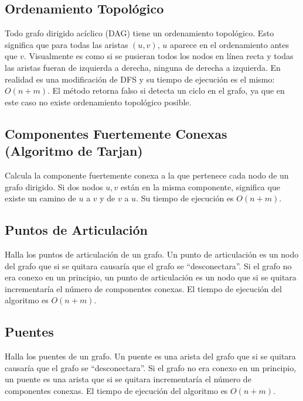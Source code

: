 \documentclass{article}
\begin{document}
\begin{multicols}{2}
	\subsection{Ordenamiento Topológico}
	Todo grafo dirigido acíclico (DAG) tiene un ordenamiento topológico. Esto significa que para todas las aristas \((u,v)\), \(u\) aparece en el ordenamiento antes que \(v\). Visualmente es como si se pusieran todos los nodos en línea recta y todas las aristas fueran de izquierda a derecha, ninguna de derecha a izquierda. En realidad es una modificación de DFS y su tiempo de ejecución es el mismo: \( O(n + m) \). El método retorna falso si detecta un ciclo en el grafo, ya que en este caso no existe ordenamiento topológico posible.
	
	
	\subsection{Componentes Fuertemente Conexas (Algoritmo de Tarjan)}
	Calcula la componente fuertemente conexa a la que pertenece cada nodo de un grafo dirigido. Si dos nodos \( u,v \) están en la misma componente, significa que existe un camino de \( u \) a \( v \) y de \( v \) a \( u \). Su tiempo de ejecución es \( O(n + m) \).
	
	
	\subsection{Puntos de Articulación}
	Halla los puntos de articulación de un grafo. Un punto de articulación es un nodo del grafo que si se quitara causaría que el grafo se ``desconectara''. Si el grafo no era conexo en un principio, un punto de articulación es un nodo que si se quitara incrementaría el número de componentes conexas. El tiempo de ejecución del algoritmo es \( O(n + m) \).
	
	
	\subsection{Puentes}
	Halla los puentes de un grafo.  Un puente es una arista del grafo que si se quitara causaría que el grafo se ``desconectara''. Si el grafo no era conexo en un principio, un puente es una arista que si se quitara incrementaría el número de componentes conexas. El tiempo de ejecución del algoritmo es \( O(n + m) \).
	


\end{multicols}
\end{document}
